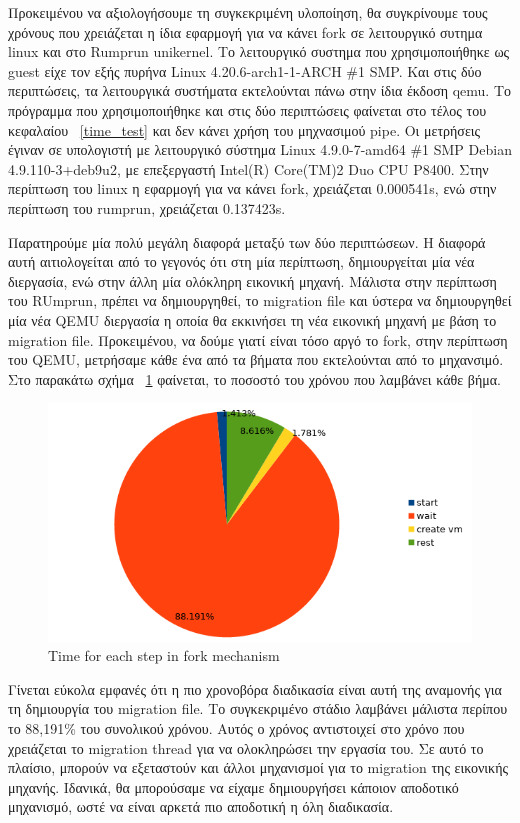 Προκειμένου να αξιολογήσουμε τη συγκεκριμένη υλοποίηση, θα συγκρίνουμε τους
χρόνους που χρειάζεται η ίδια εφαρμογή για να κάνει fork σε λειτουργικό συτημα
linux και στο Rumprun unikernel. Το λειτουργικό συστημα που χρησιμοποιήθηκε ως
guest είχε τον εξής πυρήνα Linux 4.20.6-arch1-1-ARCH \#1 SMP. Και στις δύο
περιπτώσεις, τα λειτουργικά συστήματα εκτελούνται πάνω στην ίδια έκδοση qemu. Το
πρόγραμμα που χρησιμοποιήθηκε και στις δύο περιπτώσεις φαίνεται στο τέλος του
κεφαλαίου ~\ref{time_test} και δεν κάνει χρήση του μηχνασιμού pipe. Οι μετρήσεις
έγιναν σε υπολογιστή με λειτουργικό σύστημα Linux 4.9.0-7-amd64 \#1 SMP Debian
4.9.110-3+deb9u2, με επεξεργαστή Intel(R) Core(TM)2 Duo CPU P8400. Στην
περίπτωση του linux η εφαρμογή για να κάνει fork, χρειάζεται 0.000541s,  ενώ
στην περίπτωση του rumprun, χρειάζεται 0.137423s. 

Παρατηρούμε μία πολύ μεγάλη διαφορά μεταξύ των δύο περιπτώσεων. Η διαφορά αυτή
αιτιολογείται από το γεγονός ότι στη μία περίπτωση, δημιουργείται μία νέα
διεργασία, ενώ στην άλλη μία ολόκληρη εικονική μηχανή. Μάλιστα στην περίπτωση
του RUmprun, πρέπει να δημιουργηθεί, το migration file και ύστερα να
δημιουργηθεί μία νέα QEMU διεργασία η οποία θα εκκινήσει τη νέα εικονική μηχανή
με βάση το migration file. Προκειμένου, να δούμε γιατί είναι τόσο αργό το fork,
στην περίπτωση του QEMU, μετρήσαμε κάθε ένα από τα βήματα που εκτελούνται από 
το μηχανσιμό.  Στο παρακάτω σχήμα ~\ref{fig4_12} φαίνεται, το ποσοστό του χρόνου
που λαμβάνει κάθε βήμα. 

\begin{figure}[htp]
\centerline{\includegraphics[scale=0.8]{figures/fork_pie.png}}
\caption{Time for each step in fork mechanism\label{fig4_12}}
\end{figure}

Γίνεται εύκολα εμφανές ότι η πιο χρονοβόρα διαδικασία είναι αυτή της αναμονής
για τη δημιουργία του migration file. Το συγκεκριμένο στάδιο λαμβάνει μάλιστα
περίπου το 88,191\% του συνολικού χρόνου. Αυτός ο χρόνος αντιστοιχεί στο χρόνο
που χρειάζεται το migration thread για να ολοκληρώσει την εργασία του. Σε αυτό
το πλαίσιο, μπορούν να εξεταστούν και άλλοι μηχανισμοί για το migration της
εικονικής μηχανής. Ιδανικά, θα μπορούσαμε να είχαμε δημιουργήσει κάποιον
αποδοτικό μηχανισμό, ωστέ να είναι αρκετά πιο αποδοτική η όλη διαδικασία.

